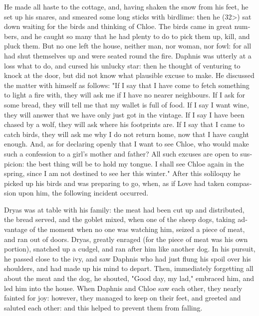 \documentclass{book}
\begin{document}
\begin{pairs}
\begin{Rightside}
\begin{english}
  He made all haste to the cottage, and, having shaken the snow from his feet, he set up his snares, and smeared some long sticks with birdlime: then he (32>) sat down waiting for the birds and thinking of Chloe.  The birds came in great numbers, and he caught so many that he had plenty to do to pick them up, kill, and pluck them.  But no one left the house, neither man, nor woman, nor fowl: for all had shut themselves up and were seated round the fire.  Daphnis was utterly at a loss what to do, and cursed his unlucky star: then he thought of venturing to knock at the door, but did not know what plausible excuse to make.  He discussed the matter with himself as follows: "If I say that I have come to fetch something to light a fire with, they will ask me if I have no nearer neighbours.  If I ask for some bread, they will tell me that my wallet is full of food.  If I say I want wine, they will answer that we have only just got in the vintage.  If I say I have been chased by a wolf, they will ask where his footprints are.  If I say that I came to catch birds, they will ask me why I do not return home, now that I have caught enough.  And, as for declaring openly that I want to see Chloe, who would make such a confession to a girl's mother and father?  All such excuses are open to suspicion: the best thing will be to hold my tongue.  I shall see Chloe again in the spring, since I am not destined to see her this winter."  After this soliloquy he picked up his birds and was preparing to go, when, as if Love had taken compassion upon him, the following incident occurred.
\pend


  Dryas was at table with his family: the meat had been cut up and distributed, the bread served, and the goblet mixed, when one of the sheep dogs, taking advantage of the moment when no one was watching him, seized a piece of meat, and ran out of doors.  Dryas, greatly enraged (for the piece of meat was his own portion), snatched up a cudgel, and ran after him like another dog.  In his pursuit, he passed close to the ivy, and saw Daphnis who had just flung his spoil over his shoulders, and had made up his mind to depart.  Then, immediately forgetting all about the meat and the dog, he shouted, "Good day, my lad," embraced him, and led him into the house.  When Daphnis and Chloe saw each other, they nearly fainted for joy: however, they managed to keep on their feet, and greeted and saluted each other: and this helped to prevent them from falling.
\pend



\end{english}
\end{Rightside}
\end{pairs}
\end{document}
